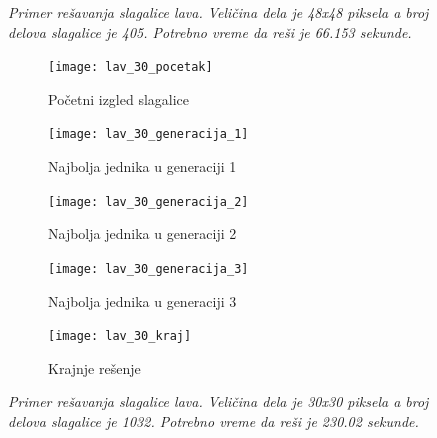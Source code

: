 \documentclass{article}
\begin{document}
\begin{figure}[h]
     \caption{\textit{Primer rešavanja slagalice lava. Veličina dela je 48x48 piksela a broj delova slagalice je 405. Potrebno vreme da reši je 66.153 sekunde.}}
\end{figure}
\clearpage
\begin{figure}[h]
     \centering
	 \captionsetup{justification=centering}
     
     \begin{subfigure}[t]{0.3\textwidth}
         \centering
         \texttt{[image: lav\_30\_pocetak]}
         \caption{{Početni izgled slagalice}}
         \label{fig:lav_30_pocetak}
     \end{subfigure}
     \hfill
     \begin{subfigure}[t]{0.3\textwidth}
         \centering
         \texttt{[image: lav\_30\_generacija\_1]}
         \caption{{Najbolja jednika u generaciji 1}}
         \label{fig:lav_30_generacija_1}
     \end{subfigure}
     \hfill
     \begin{subfigure}[t]{0.3\textwidth}
         \centering
         \texttt{[image: lav\_30\_generacija\_2]}
         \caption{{Najbolja jednika u generaciji 2}}
         \label{fig:lav_30_generacija_2}
     \end{subfigure}
     \begin{subfigure}[t]{0.3\textwidth}
         \centering
         \texttt{[image: lav\_30\_generacija\_3]}
         \caption{{Najbolja jednika u generaciji 3}}
         \label{fig:lav_30_generacija_3}
     \end{subfigure}
     \begin{subfigure}[t]{0.3\textwidth}
         \centering
         \texttt{[image: lav\_30\_kraj]}
         \caption{{Krajnje rešenje}}
         \label{fig:lav_30_kraj}
     \end{subfigure}
     
     \caption{\textit{Primer rešavanja slagalice lava. Veličina dela je 30x30 piksela a broj delova slagalice je 1032. Potrebno vreme da reši je 230.02 sekunde.}}
\end{figure}
\clearpage
\end{document}

